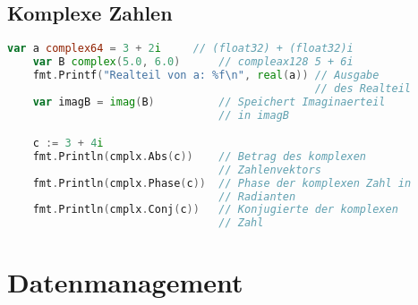 \documentclass[twoside,a4paper,12pt]{article}
\begin{document}
\subsection{Komplexe Zahlen}
\begin{center}
  \begin{minipage}{1.0\textwidth}
    \begin{lstlisting}[language=Go]
    var a complex64 = 3 + 2i     // (float32) + (float32)i
    var B complex(5.0, 6.0)      // compleax128 5 + 6i
    fmt.Printf("Realteil von a: %f\n", real(a)) // Ausgabe 
                                                // des Realteil
    var imagB = imag(B)          // Speichert Imaginaerteil 
                                 // in imagB

    c := 3 + 4i
    fmt.Println(cmplx.Abs(c))    // Betrag des komplexen 
                                 // Zahlenvektors
    fmt.Println(cmplx.Phase(c))  // Phase der komplexen Zahl in 
                                 // Radianten
    fmt.Println(cmplx.Conj(c))   // Konjugierte der komplexen 
                                 // Zahl
	  \end{lstlisting}
  \end{minipage}
\end{center}

\section{Datenmanagement}
\end{document}
